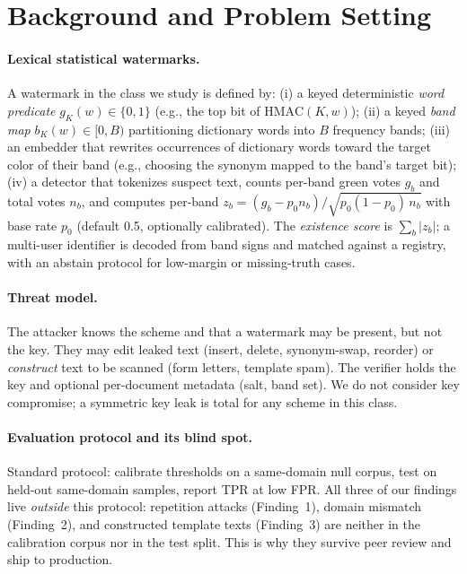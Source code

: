 \section{Background and Problem Setting}
\label{sec:background}

\paragraph{Lexical statistical watermarks.}
A watermark in the class we study is defined by: (i) a keyed deterministic
\emph{word predicate} $g_K(w) \in \{0,1\}$ (e.g., the top bit of
$\mathrm{HMAC}(K, w)$); (ii) a keyed \emph{band map} $b_K(w) \in [0, B)$
partitioning dictionary words into $B$ frequency bands; (iii) an embedder
that rewrites occurrences of dictionary words toward the target color of
their band (e.g., choosing the synonym mapped to the band's target bit);
(iv) a detector that tokenizes suspect text, counts per-band green votes
$g_b$ and total votes $n_b$, and computes per-band $z_b = (g_b - p_0 n_b) /
\sqrt{p_0(1-p_0)\,n_b}$ with base rate $p_0$ (default 0.5, optionally
calibrated). The \emph{existence score} is $\sum_b |z_b|$; a multi-user
identifier is decoded from band signs and matched against a registry,
with an abstain protocol for low-margin or missing-truth cases.

\paragraph{Threat model.}
The attacker knows the scheme and that a watermark may be present, but not
the key. They may edit leaked text (insert, delete, synonym-swap, reorder)
or \emph{construct} text to be scanned (form letters, template spam). The
verifier holds the key and optional per-document metadata (salt, band set).
We do not consider key compromise; a symmetric key leak is total for any
scheme in this class.

\paragraph{Evaluation protocol and its blind spot.}
Standard protocol: calibrate thresholds on a same-domain null corpus, test
on held-out same-domain samples, report TPR at low FPR. All three of our
findings live \emph{outside} this protocol: repetition attacks
(Finding~1), domain mismatch (Finding~2), and constructed template texts
(Finding~3) are neither in the calibration corpus nor in the test split.
This is why they survive peer review and ship to production.
